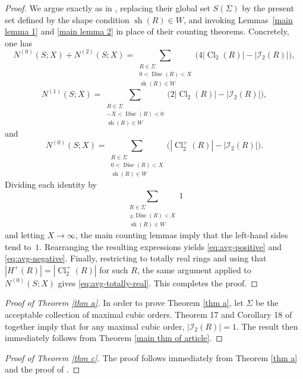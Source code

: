 \documentclass[table]{amsart}
\newcommand{\op}[1]{\operatorname{#1}}
\numberwithin{equation}{section}
\begin{document}
\begin{proof}
We argue exactly as in \cite[(17)]{BhargavaVarma}, replacing their global set
$S(\Sigma)$ by the present set defined by the shape condition
$\op{sh}(R)\in W$, and invoking Lemmas~\ref{main lemma 1} and
\ref{main lemma 2} in place of their counting theorems. Concretely, one has
\[
N^{(0)}(S;X)+N^{(2)}(S;X)
=
\sum_{\substack{R\in\Sigma\\0<\op{Disc}(R)<X\\ \op{sh}(R)\in W}}
\bigl(4|\op{Cl}_2(R)|-|\mathcal{I}_2(R)|\bigr),
\]
\[
N^{(1)}(S;X)
=
\sum_{\substack{R\in\Sigma\\-X<\op{Disc}(R)<0\\ \op{sh}(R)\in W}}
\bigl(2|\op{Cl}_2(R)|-|\mathcal{I}_2(R)|\bigr),
\]
and
\[
N^{(0)}(S;X)
=
\sum_{\substack{R\in\Sigma\\0<\op{Disc}(R)<X\\ \op{sh}(R)\in W}}
\bigl(|\op{Cl}_2^{+}(R)|-|\mathcal{I}_2(R)|\bigr).
\]
\noindent Dividing each identity by
\[
\sum_{\substack{R\in\Sigma\\ \pm\op{Disc}(R)<X\\ \op{sh}(R)\in W}} 1
\]
and letting $X\to\infty$, the main counting lemmas imply that the left-hand sides
tend to~$1$. Rearranging the resulting expressions yields
\eqref{eq:avg-positive} and \eqref{eq:avg-negative}. Finally, restricting to
totally real rings and using that
$|H^{+}(R)|=|\op{Cl}_2^{+}(R)|$ for such $R$, the same argument applied to
$N^{(0)}(S;X)$ gives \eqref{eq:avg-totally-real}. This completes the proof.
\end{proof}

\begin{proof}[Proof of Theorem \ref{thm a}]
    In order to prove Theorem \ref{thm a}, let $\Sigma$ be the acceptable collection of maximal cubic orders. Theorem 17 and Corollary 18 of \cite{BhargavaVarma} together imply that for any maximal cubic order, $|\mathcal{I}_2(R)|=1$. The result then immediately follows from Theorem \ref{main thm of article}.
\end{proof}

\begin{proof}[Proof of Theorem \ref{thm c}]
    The proof follows immediately from Theorem \ref{thm a} and the proof of \cite[Corollary 3]{BhargavaVarma}.
\end{proof}



\end{document}
